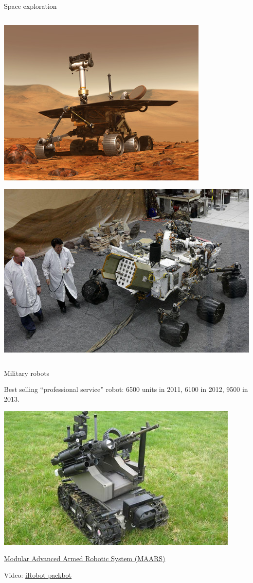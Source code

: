 \documentclass[compress]{beamer}
\begin{document}
\begin{frame}{Space exploration}
\begin{columns}
\begin{column}{0.4\linewidth}
\begin{center}
            \includegraphics[width=0.6\linewidth]{space-robot-spirit}

            \includegraphics[width=0.6\linewidth]{space-robot-curiosity}
        \end{center}
        \end{column}
    \end{columns}
\end{frame}

\begin{frame}{Military robots}

Best selling ``professional service'' robot: 6500 units in 2011, 6100 in
2012, 9500 in 2013.

    \begin{center}
        \includegraphics[width=0.6\linewidth]{defence-robot}

        \footnotesize \href{https://en.wikipedia.org/wiki/Modular_Advanced_Armed_Robotic_System}{Modular Advanced Armed Robotic System (MAARS)}
    \end{center}

    Video: \href{http://youtu.be/eaP0waiz43w}{iRobot packbot}

\end{frame}
\end{document}
